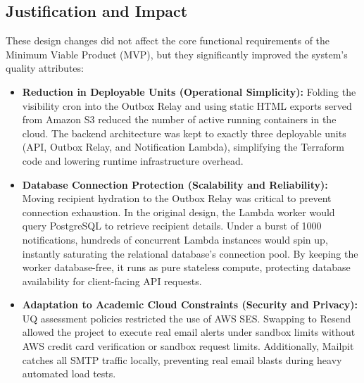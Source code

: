 \subsection{Justification and Impact}
These design changes did not affect the core functional requirements of the Minimum Viable Product (MVP), but they significantly improved the system's quality attributes:

\begin{itemize}
    \item \textbf{Reduction in Deployable Units (Operational Simplicity):} Folding the visibility cron into the Outbox Relay and using static HTML exports served from Amazon S3 reduced the number of active running containers in the cloud. The backend architecture was kept to exactly three deployable units (API, Outbox Relay, and Notification Lambda), simplifying the Terraform code and lowering runtime infrastructure overhead.
    \item \textbf{Database Connection Protection (Scalability and Reliability):} Moving recipient hydration to the Outbox Relay was critical to prevent connection exhaustion. In the original design, the Lambda worker would query PostgreSQL to retrieve recipient details. Under a burst of 1000 notifications, hundreds of concurrent Lambda instances would spin up, instantly saturating the relational database's connection pool. By keeping the worker database-free, it runs as pure stateless compute, protecting database availability for client-facing API requests.
    \item \textbf{Adaptation to Academic Cloud Constraints (Security and Privacy):} UQ assessment policies restricted the use of AWS SES. Swapping to Resend allowed the project to execute real email alerts under sandbox limits without AWS credit card verification or sandbox request limits. Additionally, Mailpit catches all SMTP traffic locally, preventing real email blasts during heavy automated load tests.
\end{itemize}